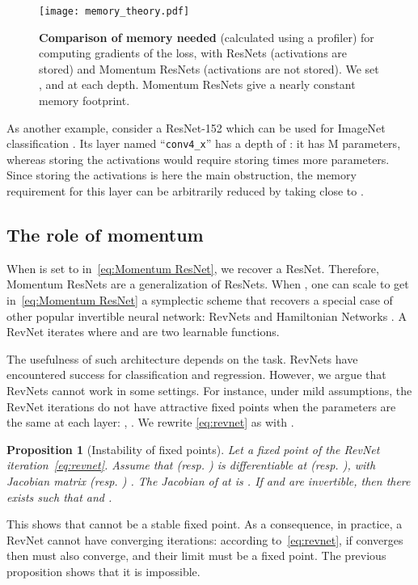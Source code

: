\documentclass{article}
\newtheorem{proposition}{Proposition}
\begin{document}
\begin{figure}[H]
\centering
\texttt{[image: memory\_theory.pdf]} 
\caption{{\bf Comparison of memory needed} (calculated using a profiler) for computing gradients of the loss, with ResNets (activations are stored) and Momentum ResNets (activations are not stored). We set ,  and  at each depth. Momentum ResNets give a nearly constant memory footprint.
}\label{fig:memo_theory}
\vspace{-1em}
\end{figure}

As another example, consider a ResNet-152 \citep{he2015deep} which can be used for ImageNet classification \citep{deng2009imagenet}. Its layer named ``\texttt{conv4\_x}'' has a depth of : it has  M parameters, whereas storing the activations would require storing  times more parameters. Since storing the activations is here the main obstruction, the memory requirement for this layer can be arbitrarily reduced by taking  close to .




\subsection{The role of momentum}\label{sec:role_momentum}

When  is set to  in~\eqref{eq:Momentum ResNet}, we recover a ResNet. Therefore, Momentum ResNets are a generalization of ResNets. When , one can scale  to get in~\eqref{eq:Momentum ResNet}
a symplectic scheme \citep{Hairer:1250576} that recovers a special case of other popular invertible neural network: RevNets \citep{gomez2017reversible} and Hamiltonian Networks \citep{chang2017reversible}. 
A RevNet iterates 
where  and  are two learnable functions.


The usefulness of such architecture depends on the task.
RevNets have encountered success for classification and regression.
However, we argue that RevNets cannot work in some settings.
For instance, under mild assumptions, the RevNet iterations do not have attractive fixed points when the parameters are the same at each layer: , .
We rewrite \eqref{eq:revnet} as  with .
\begin{proposition}[Instability of fixed points]
\label{prop:revnet_fix}
Let  a fixed point of the RevNet iteration~\eqref{eq:revnet}. Assume that  (resp. ) is differentiable at  (resp. ), with Jacobian matrix  (resp. ) . The Jacobian of  at  is . 
If  and  are invertible, then there exists  such that  and .
\end{proposition}
This shows that  cannot be a stable fixed point.
As a consequence, in practice, a RevNet cannot have converging iterations: according to~\eqref{eq:revnet}, if  converges then  must also converge, and their limit must be a fixed point. 
The previous proposition shows that it is impossible.
\end{document}
